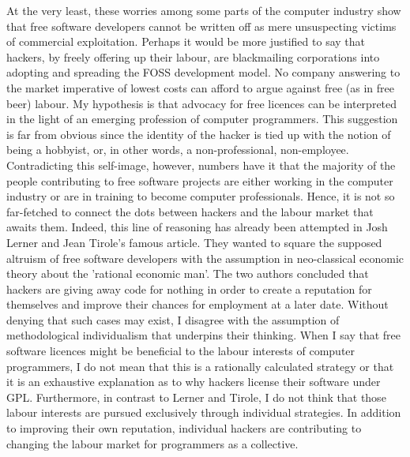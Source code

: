 At the very least, these worries among some parts of the computer industry show
that free software developers cannot be written of\hbox{}f as mere unsuspecting
victims of commercial exploitation. Perhaps it would be more justif\hbox{}ied to say
that hackers, by freely of\hbox{}fering up their labour, are blackmailing
corporations into adopting and spreading the FOSS development model. No company
answering to the market imperative of lowest costs can af\hbox{}ford to argue against
free (as in free beer) labour. My hypothesis is that advocacy for free licences
can be interpreted in the light of an emerging profession of computer
programmers. This suggestion is far from obvious since the identity of the
hacker is tied up with the notion of being a hobbyist, or, in other words, a
non-professional, non-employee. Contradicting this self-image, however, numbers
have it that the majority of the people contributing to free software projects
are either working in the computer industry or are in training to become
computer professionals\cite{gnunited-lakhani_wolf05}. Hence, it is not so
far-fetched to connect the dots between hackers and the labour market that
awaits them. Indeed, this line of reasoning has already been attempted in Josh
Lerner and Jean Tirole's famous article\cite{gnunited-lerner_tirole02}. They
wanted to square the supposed altruism of free software developers with the
assumption in neo-classical economic theory about the 'rational economic man'.
The two authors concluded that hackers are giving away code for nothing in order
to create a reputation for themselves and improve their chances for employment
at a later date. Without denying that such cases may exist, I disagree with the
assumption of methodological individualism that underpins their thinking. When I
say that free software licences might be benef\hbox{}icial to the labour interests of
computer programmers, I do not mean that this is a rationally calculated
strategy or that it is an exhaustive explanation as to why hackers license their
software under GPL. Furthermore, in contrast to Lerner and Tirole, I do not
think that those labour interests are pursued exclusively through individual
strategies. In addition to improving their own reputation, individual hackers
are contributing to changing the labour market for programmers as a collective. 


